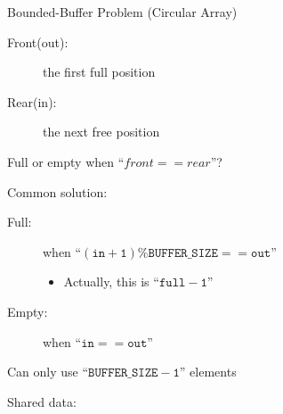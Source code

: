 \begin{frame}{Bounded-Buffer Problem (Circular Array)}
  \begin{minipage}{.65\linewidth}
  \begin{description}
  \item[Front(out):] the first full position
  \item[Rear(in):] the next free position
  \end{description}
  \end{minipage}\quad
  \begin{minipage}{.3\linewidth}
  \end{minipage}
  Full or empty when ``$front == rear$''?
\end{frame}

\begin{frame}
  \begin{block}{Common solution:}
    \begin{description}
    \item[Full:] when ``$\mathtt{(in+1)\%BUFFER\_SIZE == out}$''
      \begin{itemize}
      \item[] Actually, this is ``$\mathtt{full - 1}$''
      \end{itemize}
    \item[Empty:] when ``$\mathtt{in == out}$''
    \end{description}
    Can only use ``$\mathtt{BUFFER\_SIZE-1}$'' elements
  \end{block}  
  \begin{block}{Shared data:}
    \begin{center}
    \end{center}
  \end{block}
\end{frame}

